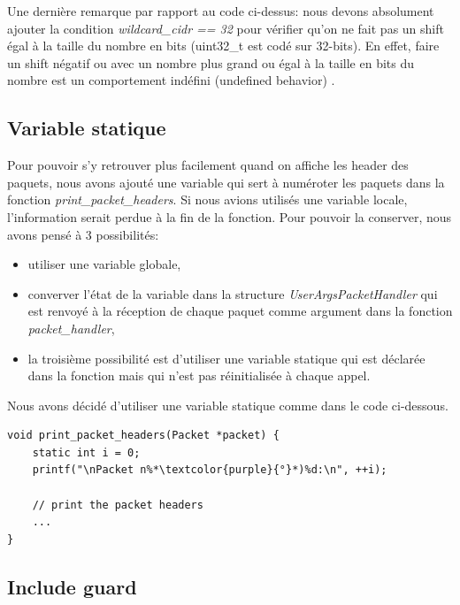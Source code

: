 \documentclass[a4paper]{article}
\begin{document}
Une dernière remarque par rapport au code ci-dessus: nous devons absolument ajouter la condition \textit{wildcard\_cidr == 32} pour vérifier qu'on ne fait pas un shift égal à la taille du nombre en bits (uint32\_t est codé sur 32-bits). En effet, faire un shift négatif ou avec un nombre plus grand ou égal à la taille en bits du nombre est un comportement indéfini (undefined behavior) \cite{9}.





\subsection{Variable statique}



Pour pouvoir s'y retrouver plus facilement quand on affiche les header des paquets, nous avons ajouté une variable qui sert à numéroter les paquets dans la fonction \textit{print\_packet\_headers}. Si nous avions utilisés une variable locale, l'information serait perdue à la fin de la fonction. Pour pouvoir la conserver, nous avons pensé à 3 possibilités:
\begin{itemize}
    \item utiliser une variable globale,
    \item converver l'état de la variable dans la structure \textit{UserArgsPacketHandler} qui est renvoyé à la réception de chaque paquet comme argument dans la fonction \textit{packet\_handler},
    \item la troisième possibilité est d'utiliser une variable statique qui est déclarée dans la fonction mais qui n'est pas réinitialisée à chaque appel.
\end{itemize}
Nous avons décidé d'utiliser une variable statique comme dans le code ci-dessous.

\begin{lstlisting}[style=CStyle]
void print_packet_headers(Packet *packet) {
    static int i = 0;
    printf("\nPacket n%*\textcolor{purple}{°}*)%d:\n", ++i);

    // print the packet headers
    ...
}
\end{lstlisting}





\subsection{Include guard}
\end{document}
